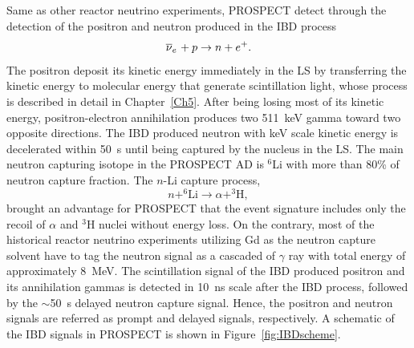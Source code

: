 	Same as other reactor neutrino experiments, PROSPECT detect \nuebar through the detection of the positron and neutron produced in the IBD process
	\begin{equation}
        \overline{\nu }_{e}\hspace{1pt} + p \rightarrow n + e^+.
    \end{equation}	    
	The positron deposit its kinetic energy immediately in the LS by transferring the kinetic energy to molecular energy that generate scintillation light, whose process is described in detail in Chapter~\ref{Ch5}.
	After being losing most of its kinetic energy, positron-electron annihilation produces two 511~keV gamma toward two opposite directions. 
	The IBD produced neutron with keV scale kinetic energy is decelerated within 50~\textmu s until being captured by the nucleus in the LS. 
	The main neutron capturing isotope in the PROSPECT AD is $^6$Li with more than 80\% of neutron capture fraction.
	The $n$-Li capture process,
	\begin{equation}
       	n+^6\textrm{Li} \rightarrow \alpha + ^3\textrm{H},
    \end{equation}
    brought an advantage for PROSPECT that the event signature includes only the recoil of $\alpha$ and $^3$H nuclei without energy loss. 
    On the contrary, most of the historical reactor neutrino experiments utilizing Gd as the neutron capture solvent have to tag the neutron signal as a cascaded of $\gamma$ ray with total energy of approximately 8~MeV.
 	The scintillation signal of the IBD produced positron and its annihilation gammas is detected in 10~ns scale after the IBD process, followed by the $\sim$50~\textmu s delayed neutron capture signal. 
 	Hence, the positron and neutron signals are referred as prompt and delayed signals, respectively.
	A schematic of the IBD signals in PROSPECT is shown in Figure~\ref{fig:IBDscheme}.
